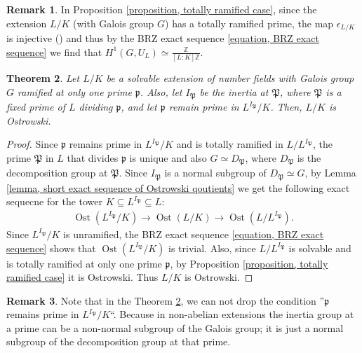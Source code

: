 \documentclass{amsart}
\newtheorem{theorem}{Theorem}[section]
\theoremstyle{definition}
\newtheorem{remark}[theorem]{Remark}
\numberwithin{equation}{section}
\DeclareMathOperator{\Ost}{Ost}
\begin{document}
\begin{remark}
In Proposition \ref{proposition, totally ramified case}, since the extension $L/K$ (with Galois group $G$) has a totally ramified prime, the map $\epsilon_{L/K}$ is injective (\cite[Theorem 2.1]{Masley}) and thus by the BRZ exact sequence \eqref{equation, BRZ exact sequence} we find that $H^1(G,U_L) \simeq \frac{\mathbb{Z}}{[L:K]\mathbb{Z}}$.
\end{remark}

\begin{theorem} \label{theorem, solvable extensions are Ostrowski, conditional}
Let $L/K$ be a solvable extension of number fields with Galois group $G$ ramified at only one prime $\mathfrak{p}$. Also, let $I_{\mathfrak{P}}$ be the inertia at $\mathfrak{P}$, where $\mathfrak{P}$ is a fixed prime of $L$ dividing $\mathfrak{p}$, and let $\mathfrak{p}$ remain prime in $L^{I_{\mathfrak{P}}}/K$. Then, $L/K$ is Ostrowski.
\end{theorem}

\begin{proof}
Since $\mathfrak{p}$ remains prime in $L^{I_{\mathfrak{P}}}/K$ and is totally ramified in $L/L^{I_{\mathfrak{P}}}$, the prime $\mathfrak{P}$ in $L$ that divides $\mathfrak{p}$ is unique and also $G \simeq D_{\mathfrak{P}}$, where $D_{\mathfrak{P}}$ is the decomposition group at $\mathfrak{P}$. Since $I_{\mathfrak{P}}$ is a normal subgroup of $D_{\mathfrak{P}}\simeq G$, by Lemma \ref{lemma, short exact sequence of Ostrowski qoutients} we get the following exact sequecne for the tower $K \subseteq L^{I_{\mathfrak{P}}} \subseteq L$:
\begin{align*}
\Ost(L^{I_{\mathfrak{P}}}/K) \rightarrow \Ost(L/K) \rightarrow \Ost(L/L^{I_{\mathfrak{P}}}).
\end{align*}
Since $L^{I_{\mathfrak{P}}}/K$ is unramified, the BRZ exact sequence \eqref{equation, BRZ exact sequence} shows that $\Ost(L^{I_{\mathfrak{P}}}/K)$ is trivial. Also, since $L/L^{I_{\mathfrak{P}}}$ is solvable and is totally ramified at only one prime $\mathfrak{p}$, by Proposition \ref{proposition, totally ramified case} it is Ostrowski. Thus $L/K$ is Ostrowski.
\end{proof}

\begin{remark}
Note that in the Theorem \ref{theorem, solvable extensions are Ostrowski, conditional}, we can not drop the condition ''$\mathfrak{p}$ remains prime in $L^{I_{\mathfrak{P}}}/K$``. Because in non-abelian extensions the inertia group at a prime can be a non-normal subgroup of the Galois group; it is just a normal subgroup of the decomposition group at that prime.
\end{remark}
\end{document}
